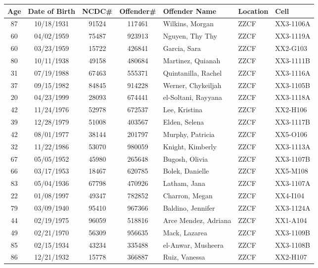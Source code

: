 \documentclass[]{article}
\begin{document}
\begin{tabular}{cccclll}
 {\textbf{Age}} & {\textbf{Date of Birth}} & {\textbf{NCDC\#}} & {\textbf{Offender\#}} & {\textbf{Offender Name}} & {\textbf{Location}} & {\textbf{Cell}} \\ 
  \hline
 87 & 10/18/1931 & 91524 & 117461 & Wilkins, Morgan & ZZCF & XX3-1106A \\ 
   60 & 04/02/1959 & 75487 & 923913 & Nguyen, Thy Thy & ZZCF & XX3-1119A \\ 
   60 & 03/23/1959 & 15722 & 426841 & Garcia, Sara & ZZCF & XX2-G103 \\ 
   80 & 10/11/1938 & 49158 & 480684 & Martinez, Quianah & ZZCF & XX3-1111B \\ 
   31 & 07/19/1988 & 67463 & 555371 & Quintanilla, Rachel & ZZCF & XX3-1116A \\ 
   37 & 09/15/1982 & 84845 & 914228 & Werner, Chykeiljah & ZZCF & XX3-1105B \\ 
   20 & 04/23/1999 & 28093 & 674441 & el-Soltani, Rayyana & ZZCF & XX3-1118A \\ 
   42 & 11/24/1976 & 52978 & 672537 & Lee, Kristina & ZZCF & XX2-H106 \\ 
   39 & 12/28/1979 & 51008 & 403567 & Elden, Selena & ZZCF & XX3-1117B \\ 
   42 & 08/01/1977 & 38144 & 201797 & Murphy, Patricia & ZZCF & XX5-O106 \\ 
   32 & 11/22/1986 & 53070 & 980059 & Knight, Kimberly & ZZCF & XX3-1113A \\ 
   67 & 05/05/1952 & 45980 & 265648 & Bugosh, Olivia & ZZCF & XX3-1107B \\ 
   66 & 03/17/1953 & 18467 & 620785 & Bolek, Danielle & ZZCF & XX5-M108 \\ 
   83 & 05/04/1936 & 67798 & 470926 & Latham, Jana & ZZCF & XX3-1107A \\ 
   22 & 01/08/1997 & 49347 & 782852 & Charron, Megan & ZZCF & XX4-I104 \\ 
   79 & 03/09/1940 & 95410 & 967366 & Baldino, Jennifer & ZZCF & XX3-1124A \\ 
   44 & 02/19/1975 & 96059 & 518816 & Arce Mendez, Adriana & ZZCF & XX1-A104 \\ 
   49 & 02/21/1970 & 56309 & 956635 & Mack, Lazarea & ZZCF & XX3-1109B \\ 
   85 & 02/15/1934 & 43234 & 335488 & el-Anwar, Musheera & ZZCF & XX3-1108B \\ 
   86 & 12/21/1932 & 15778 & 366887 & Ruiz, Vanessa & ZZCF & XX2-H107 \\ 

\end{tabular}
\end{document}
